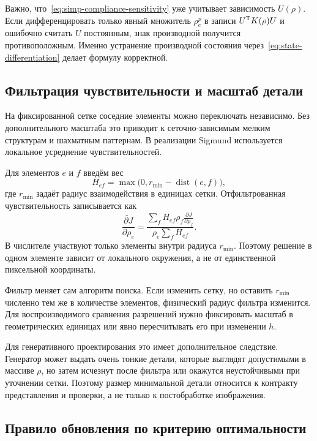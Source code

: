 Важно, что~\eqref{eq:simp-compliance-sensitivity} уже учитывает зависимость $U(\rho)$. Если дифференцировать только явный множитель $\rho_e^p$ в записи $U^{\mathsf{T}}K(\rho)U$ и ошибочно считать $U$ постоянным, знак производной получится противоположным. Именно устранение производной состояния через~\eqref{eq:state-differentiation} делает формулу корректной.

\subsection{Фильтрация чувствительности и масштаб детали}

На фиксированной сетке соседние элементы можно переключать независимо. Без дополнительного масштаба это приводит к сеточно-зависимым мелким структурам и шахматным паттернам. В реализации Sigmund используется локальное усреднение чувствительностей.

Для элементов $e$ и $f$ введём вес
\begin{equation}
 H_{ef}
 =
 \max\bigl(0,r_{\min}-\operatorname{dist}(e,f)\bigr),
\end{equation}
где $r_{\min}$ задаёт радиус взаимодействия в единицах сетки. Отфильтрованная чувствительность записывается как
\begin{equation}
 \widetilde{\frac{\partial J}{\partial\rho_e}}
 =
 \frac{
  \displaystyle
  \sum_f H_{ef}\rho_f
  \frac{\partial J}{\partial\rho_f}
 }{
  \displaystyle
  \rho_e\sum_f H_{ef}
 }.
\end{equation}
В числителе участвуют только элементы внутри радиуса $r_{\min}$. Поэтому решение в одном элементе зависит от локального окружения, а не от единственной пиксельной координаты.

Фильтр меняет сам алгоритм поиска. Если изменить сетку, но оставить $r_{\min}$ численно тем же в количестве элементов, физический радиус фильтра изменится. Для воспроизводимого сравнения разрешений нужно фиксировать масштаб в геометрических единицах или явно пересчитывать его при изменении $h$.

Для генеративного проектирования это имеет дополнительное следствие. Генератор может выдать очень тонкие детали, которые выглядят допустимыми в массиве $\rho$, но затем исчезнут после фильтра или окажутся неустойчивыми при уточнении сетки. Поэтому размер минимальной детали относится к контракту представления и проверки, а не только к постобработке изображения.

\subsection{Правило обновления по критерию оптимальности}

